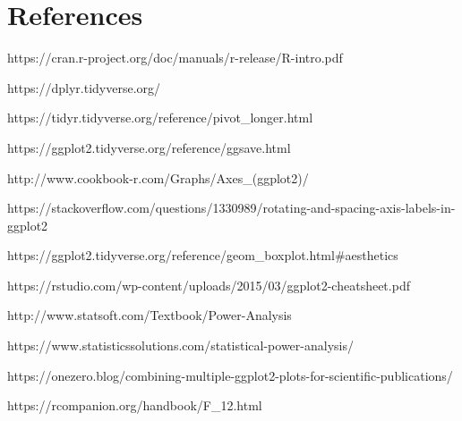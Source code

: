 \documentclass[a4paper, 12pt]{article}\usepackage[]{graphicx}\usepackage[]{color}
\begin{document}
\section{References}

https://cran.r-project.org/doc/manuals/r-release/R-intro.pdf

https://dplyr.tidyverse.org/

https://tidyr.tidyverse.org/reference/pivot_longer.html

https://ggplot2.tidyverse.org/reference/ggsave.html

http://www.cookbook-r.com/Graphs/Axes_(ggplot2)/

https://stackoverflow.com/questions/1330989/rotating-and-spacing-axis-labels-in-ggplot2

https://ggplot2.tidyverse.org/reference/geom_boxplot.html#aesthetics

https://rstudio.com/wp-content/uploads/2015/03/ggplot2-cheatsheet.pdf

http://www.statsoft.com/Textbook/Power-Analysis

https://www.statisticssolutions.com/statistical-power-analysis/

https://onezero.blog/combining-multiple-ggplot2-plots-for-scientific-publications/

https://rcompanion.org/handbook/F_12.html
\end{document}

